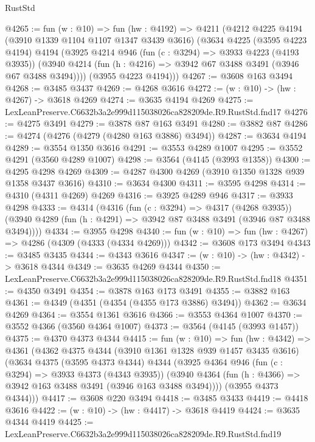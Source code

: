 \begin{lexlean}{RustStd}
\begin{coremodule}
@4265 := fun (w : @10) =>
  fun (hw : @4192) =>
  @4211
    (@4212
      @4225
      @4194
      (@3910 @1339 @1104 @1107 @1347 @3439 @3616)
      (@3634
        @4225
        (@3595 @4223 @4194)
        @4194
        (@3925
          @4214
          @946
          (fun (c : @3294) => @3933 @4223 (@4193 @3935))
          (@3940 @4214 (fun (h : @4216) => @3942 @67 @3488 @3491 (@3946 @67 @3488 @3494))))
        (@3955 @4223 @4194)))
@4267 := @3608 @163 @3494
@4268 := @3485 @3437
@4269 := @4268 @3616
@4272 := (w : @10) -> (hw : @4267) -> @3618 @4269
@4274 := @3635 @4194 @4269
@4275 := LexLeanPreserve.C6632b3a2e999d115038026ca828209de.R9.RustStd.fnd17
@4276 := @4275 @3491
@4279 := @3878 @87 @163 @3491
@4280 := @3882 @87
@4286 := @4274 (@4276 (@4279 (@4280 @163 @3886) @3494))
@4287 := @3634 @4194
@4289 := @3554 @1350 @3616
@4291 := @3553 @4289 @1007
@4295 := @3552 @4291 (@3560 @4289 @1007)
@4298 := @3564 (@4145 (@3993 @1358))
@4300 := @4295 @4298 @4269
@4309 := @4287 @4300 @4269 (@3910 @1350 @1328 @939 @1358 @3437 @3616)
@4310 := @3634 @4300
@4311 := @3595 @4298
@4314 := @4310 (@4311 @4269) @4269
@4316 := @3925 @4289 @946
@4317 := @3933 @4298
@4333 := @4314
    (@4316
      (fun (c : @3294) => @4317 (@4268 @3935))
      (@3940 @4289 (fun (h : @4291) => @3942 @87 @3488 @3491 (@3946 @87 @3488 @3494))))
@4334 := @3955 @4298
@4340 := fun (w : @10) => fun (hw : @4267) => @4286 (@4309 (@4333 (@4334 @4269)))
@4342 := @3608 @173 @3494
@4343 := @3485 @3435
@4344 := @4343 @3616
@4347 := (w : @10) -> (hw : @4342) -> @3618 @4344
@4349 := @3635 @4269 @4344
@4350 := LexLeanPreserve.C6632b3a2e999d115038026ca828209de.R9.RustStd.fnd18
@4351 := @4350 @3491
@4354 := @3878 @163 @173 @3491
@4355 := @3882 @163
@4361 := @4349 (@4351 (@4354 (@4355 @173 @3886) @3494))
@4362 := @3634 @4269
@4364 := @3554 @1361 @3616
@4366 := @3553 @4364 @1007
@4370 := @3552 @4366 (@3560 @4364 @1007)
@4373 := @3564 (@4145 (@3993 @1457))
@4375 := @4370 @4373 @4344
@4415 := fun (w : @10) =>
  fun (hw : @4342) =>
  @4361
    (@4362
      @4375
      @4344
      (@3910 @1361 @1328 @939 @1457 @3435 @3616)
      (@3634
        @4375
        (@3595 @4373 @4344)
        @4344
        (@3925
          @4364
          @946
          (fun (c : @3294) => @3933 @4373 (@4343 @3935))
          (@3940 @4364 (fun (h : @4366) => @3942 @163 @3488 @3491 (@3946 @163 @3488 @3494))))
        (@3955 @4373 @4344)))
@4417 := @3608 @220 @3494
@4418 := @3485 @3433
@4419 := @4418 @3616
@4422 := (w : @10) -> (hw : @4417) -> @3618 @4419
@4424 := @3635 @4344 @4419
@4425 := LexLeanPreserve.C6632b3a2e999d115038026ca828209de.R9.RustStd.fnd19

\end{coremodule}
\end{lexlean}
